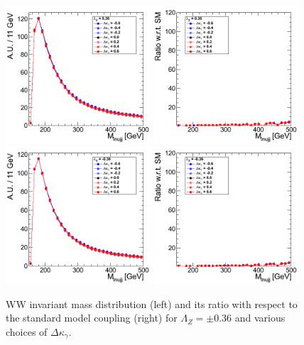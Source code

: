 \begin{figure}[h!t]
  {\centering
    \includegraphics[width=0.48\textwidth]{figs/Mass4Body_036.png}
    \includegraphics[width=0.48\textwidth]{figs/Mass4Body_036_ratio.png}
    \includegraphics[width=0.48\textwidth]{figs/Mass4Body_m036.png}
    \includegraphics[width=0.48\textwidth]{figs/Mass4Body_m036_ratio.png}
    \caption{WW invariant mass distribution (left) and its ratio with respect to 
    the standard model coupling (right) for $\Lambda_Z = \pm 0.36$ and various choices of $\Delta{\kappa_\gamma}$.}
    \label{fig:ww_Mass4Body_atgcRatio036}}
\end{figure}
